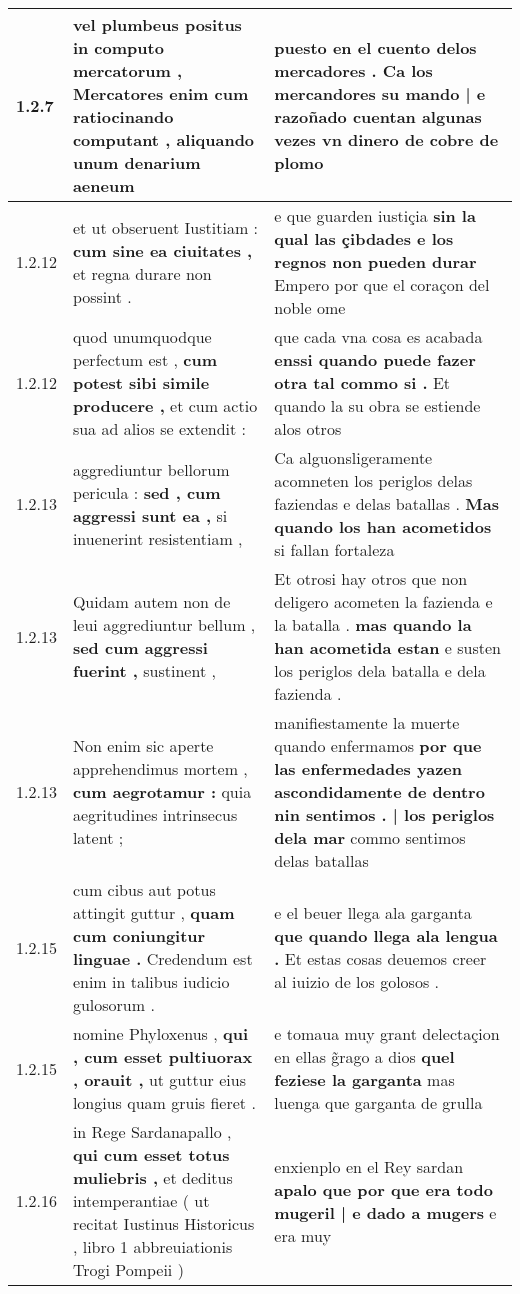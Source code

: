 \begin{tabular}{|p{1cm}|p{6.5cm}|p{6.5cm}|}
1.2.7 & vel plumbeus positus in computo mercatorum , \textbf{ Mercatores enim cum ratiocinando computant , } aliquando unum denarium aeneum & puesto en el cuento delos mercadores . \textbf{ Ca los mercandores su mando | e razoñado cuentan algunas vezes } vn dinero de cobre de plomo \\\hline
1.2.12 & et ut obseruent Iustitiam : \textbf{ cum sine ea ciuitates , } et regna durare non possint . & e que guarden iustiçia \textbf{ sin la qual las çibdades e los regnos non pueden durar } Empero por que el coraçon del noble ome \\\hline
1.2.12 & quod unumquodque perfectum est , \textbf{ cum potest sibi simile producere , } et cum actio sua ad alios se extendit : & que cada vna cosa es acabada \textbf{ enssi quando puede fazer otra tal commo si . } Et quando la su obra se estiende alos otros \\\hline
1.2.13 & aggrediuntur bellorum pericula : \textbf{ sed , cum aggressi sunt ea , } si inuenerint resistentiam , & Ca alguonsligeramente acomneten los periglos delas faziendas e delas batallas . \textbf{ Mas quando los han acometidos } si fallan fortaleza \\\hline
1.2.13 & Quidam autem non de leui aggrediuntur bellum , \textbf{ sed cum aggressi fuerint , } sustinent , & Et otrosi hay otros que non deligero acometen la fazienda e la batalla . \textbf{ mas quando la han acometida estan } e susten los periglos dela batalla e dela fazienda . \\\hline
1.2.13 & Non enim sic aperte apprehendimus mortem , \textbf{ cum aegrotamur : } quia aegritudines intrinsecus latent ; & manifiestamente la muerte quando enfermamos \textbf{ por que las enfermedades yazen ascondidamente de dentro nin sentimos . | los periglos dela mar } commo sentimos delas batallas \\\hline
1.2.15 & cum cibus aut potus attingit guttur , \textbf{ quam cum coniungitur linguae . } Credendum est enim in talibus iudicio gulosorum . & e el beuer llega ala garganta \textbf{ que quando llega ala lengua . } Et estas cosas deuemos creer al iuizio de los golosos . \\\hline
1.2.15 & nomine Phyloxenus , \textbf{ qui , cum esset pultiuorax , orauit , } ut guttur eius longius quam gruis fieret . & e tomaua muy grant delectaçion en ellas g̃rago a dios \textbf{ quel feziese la garganta } mas luenga que garganta de grulla \\\hline
1.2.16 & in Rege Sardanapallo , \textbf{ qui cum esset totus muliebris , } et deditus intemperantiae ( ut recitat Iustinus Historicus , libro 1 abbreuiationis Trogi Pompeii ) & enxienplo en el Rey sardan \textbf{ apalo que por que era todo mugeril | e dado a mugers } e era muy \\\hline

\end{tabular}
